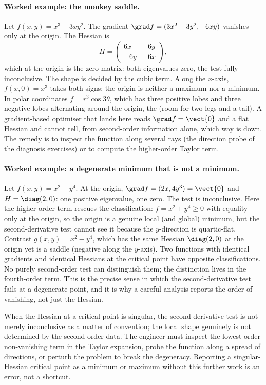 \paragraph{Worked example: the monkey saddle.} Let $f(x, y) = x^{3}
- 3 x y^{2}$. The gradient $\grad f = (3 x^{2} - 3 y^{2}, -6 x y)$
vanishes only at the origin. The Hessian is
\[
H = \begin{pmatrix} 6 x & -6 y \\ -6 y & -6 x \end{pmatrix},
\]
which at the origin is the zero matrix: both eigenvalues zero, the
test fully inconclusive. The shape is decided by the cubic term.
Along the $x$-axis, $f(x, 0) = x^{3}$ takes both signs; the origin
is neither a maximum nor a minimum. In polar coordinates $f =
r^{3}\cos 3\theta$, which has three positive lobes and three
negative lobes alternating around the origin, the  (room for two legs and a tail). A gradient-based optimiser
that lands here reads $\grad f = \vect{0}$ and a flat Hessian and
cannot tell, from second-order information alone, which way is down.
The remedy is to inspect the function along several rays (the
direction probe of the diagnosis exercises) or to compute the
higher-order Taylor term.

\paragraph{Worked example: a degenerate minimum that is not a
minimum.} Let $f(x, y) = x^{2} + y^{4}$. At the origin, $\grad f =
(2x, 4 y^{3}) = \vect{0}$ and $H = \diag(2, 0)$: one positive
eigenvalue, one zero. The test is inconclusive. Here the higher-order
term rescues the classification: $f = x^{2} + y^{4} \geq 0$ with
equality only at the origin, so the origin is a genuine local (and
global) minimum, but the second-derivative test cannot see it
because the $y$-direction is quartic-flat. Contrast $g(x, y) = x^{2}
- y^{4}$, which has the same Hessian $\diag(2, 0)$ at the origin yet
is a saddle (negative along the $y$-axis). Two functions with
identical gradients and identical Hessians at the critical point
have opposite classifications. No purely second-order test can
distinguish them; the distinction lives in the fourth-order term.
This is the precise sense in which the second-derivative test fails
at a degenerate point, and it is why a careful analysis reports the
order of vanishing, not just the Hessian.

\begin{principle}
When the Hessian at a critical point is singular, the
second-derivative test is not merely inconclusive as a matter of
convention; the local shape genuinely is not determined by the
second-order data. The engineer must inspect the lowest-order
non-vanishing term in the Taylor expansion, probe the function along
a spread of directions, or perturb the problem to break the
degeneracy. Reporting a singular-Hessian critical point as a minimum
or maximum without this further work is an error, not a shortcut.
\end{principle}

